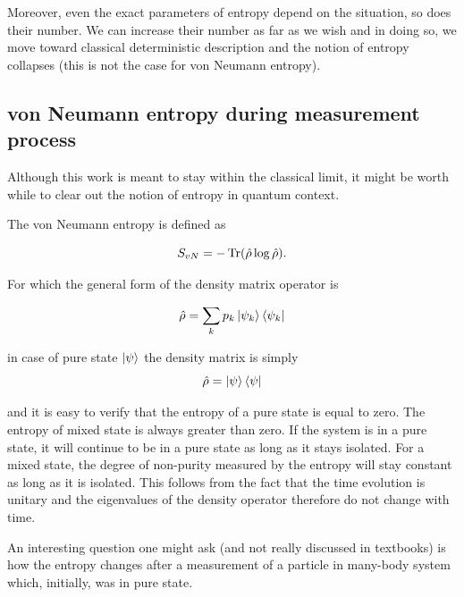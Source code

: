 \documentclass[a4paper,12pt]{article}
\begin{document}
Moreover, even the exact parameters of entropy depend on the situation, so does their number. We can increase their number as far as we wish and in doing so, we move toward classical deterministic description and the notion of entropy collapses (this is not the case for von Neumann entropy).

\subsection{von Neumann entropy during measurement process}

Although this work is meant to stay within the classical limit, it might be worth while to clear out the notion of entropy in quantum context.

The von Neumann entropy is defined as 

\begin{equation}
  S_{vN}= -\Tr(\hat{\rho} \log{\hat{\rho}}).
\end{equation}

For which the general form of the density matrix operator is

\begin{equation}
	\hat{\rho}=\sum_k p_k \ket{\psi_k}\bra{\psi_k} 
\end{equation}

in case of pure state $\ket{\psi}$ the density matrix is simply
\begin{equation}
  \hat{\rho} = \ket{\psi}\bra{\psi}
\end{equation}

and it is easy to verify that the entropy of a pure state is equal to zero. The entropy of mixed state is always greater than zero.
If the system is in a pure state, it will continue to be in a pure state as long as it stays isolated. For a mixed state, the degree of non-purity measured by the entropy will stay constant as long as it is isolated. This follows from the fact that the time evolution is unitary and the eigenvalues of the density operator therefore do not change with time.

An interesting question one might ask (and not really discussed in textbooks) is how the entropy changes after a measurement of a particle in many-body system which, initially, was in pure state.
\end{document}
